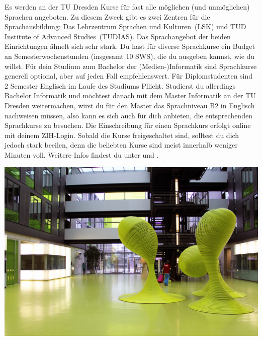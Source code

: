 Es werden an der TU Dresden Kurse für fast alle möglichen (und unmöglichen) Sprachen angeboten.
Zu diesem Zweck gibt es zwei Zentren für die Sprachausbildung: Das \glqq Lehrzentrum Sprachen und Kulturen\grqq\ (LSK) und \glqq TUD Institute of Advanced Studies\grqq\ (TUDIAS).
Das Sprachangebot der beiden Einrichtungen ähnelt sich sehr stark.
Du hast für diverse Sprachkurse ein Budget an Semesterwochenstunden (insgesamt 10 SWS), die du ausgeben kannst, wie du willst.
Für dein Studium zum Bachelor der (Medien-)Informatik sind Sprachkurse generell optional, aber auf jeden Fall empfehlenswert.
Für Diplomstudenten sind 2 Semester Englisch im Laufe des Studiums Pflicht.
Studierst du allerdings Bachelor Informatik und möchtest danach mit dem Master Informatik an der TU Dresden weitermachen, wirst du für den Master das Sprachniveau B2 in Englisch nachweisen müssen,
also kann es sich auch für dich anbieten, die entsprechenden Sprachkurse zu besuchen.
Die Einschreibung für einen Sprachkurs erfolgt online  mit deinem ZIH-Login.
Sobald die Kurse freigeschaltet sind, solltest du dich jedoch stark beeilen, denn die beliebten Kurse sind meist innerhalb weniger Minuten voll.
Weitere Infos findest du unter  und .

\vfill
\begin{center}
  \includegraphics[width=.7\linewidth]{img/ese2013/foyer.jpg}
\end{center}
